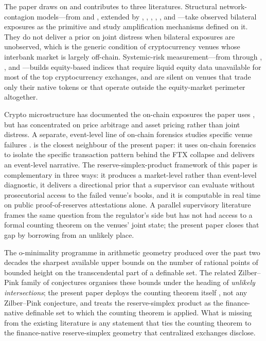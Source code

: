 \documentclass[12pt]{article}
\theoremstyle{sampledef}
\theoremstyle{sampleplain}
\theoremstyle{sampleremark}
\newcommand{\1}{\mathbf{1}}
\begin{document}
The paper draws on and contributes to three literatures.
Structural network-contagion models---from \citet{AllenGale2000} and
\citet{FreixasParigiRochet2000}, extended by
\citet{ElliottGolubJackson2014}, \citet{AcemogluOzdaglarTahbaz2015},
\citet{GlassermanYoung2015}, \citet{RochetTirole1996},
\citet{CabralesGaleGottardi2016}, and \citet{DuffieZhu2011}---take
observed bilateral exposures as the primitive and study amplification
mechanisms defined on it. They do not deliver a prior on joint
distress when bilateral exposures are unobserved, which is the
generic condition of cryptocurrency venues whose interbank market is
largely off-chain. Systemic-risk measurement---from
\citet{AdrianBrunnermeier2016CoVaR} through
\citet{AcharyaEtAl2017SES}, \citet{BrownleesEngle2017SRISK}, and
\citet{BillioEtAl2012}---builds equity-based indices that require
liquid equity data unavailable for most of the top cryptocurrency
exchanges, and are silent on venues that trade only their native
tokens or that operate outside the equity-market perimeter altogether.

Crypto microstructure has documented the on-chain exposures the paper
uses \citep{MakarovSchoar2020, GriffinShams2020, Cong-Li-Wang2021,
LiuTsyvinski2021, Aramonte-Huang-Schrimpf2021},
but has concentrated on price arbitrage and asset pricing rather than
joint distress. A separate, event-level line of on-chain forensics
studies specific venue failures \citep{Griffin-Kruger2023}.
\citet{Griffin-Kruger2023} is the closest neighbour of the
present paper: it uses on-chain forensics to isolate the specific
transaction pattern behind the FTX collapse and delivers an
event-level narrative. The reserve-simplex-product framework of
this paper is complementary in three ways: it produces a market-level
rather than event-level diagnostic, it delivers a directional prior
that a supervisor can evaluate without prosecutorial access to the
failed venue's books, and it is computable in real time on public
proof-of-reserves attestations alone. A parallel supervisory
literature \citep{BCBS2021Crypto, FSB2023Crypto, Aldasoro2023Stablecoin}
frames the same question from the regulator's side but has not had
access to a formal counting theorem on the venues' joint state;
the present paper closes that gap by borrowing from an unlikely
place.

The o-minimality programme in arithmetic geometry
\citep{PilaWilkie2006, vandenDries1998Tame,
Pila2011ManinMumford, BakkerKlinglerTsimerman2020,
PeterzilStarchenko2008} produced over
the past two decades the sharpest available upper bounds on the
number of rational points of bounded height on the transcendental
part of a definable set. The
related Zilber--Pink family of conjectures
\citep{Pink2005ZilberPink, Zilber2002} organises these bounds under
the heading of \emph{unlikely intersections}; the present paper
deploys the counting theorem itself \citep{PilaWilkie2006}, not any
Zilber--Pink conjecture, and treats the reserve-simplex product as
the finance-native definable set to which the counting theorem is
applied. What is missing from the existing literature is any
statement that ties the counting theorem to the finance-native
reserve-simplex geometry that centralized exchanges disclose.
\end{document}
